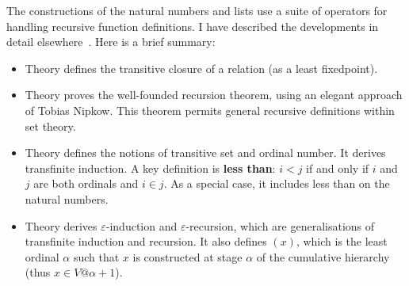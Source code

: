 The constructions of the natural numbers and lists use a suite of
operators for handling recursive function definitions.  I have described
the developments in detail elsewhere~\cite{paulson-set-II}.  Here is a brief
summary:
\begin{itemize}
  \item Theory  defines the transitive closure of a relation
    (as a least fixedpoint).

  \item Theory  proves the well-founded recursion theorem, using an
    elegant approach of Tobias Nipkow.  This theorem permits general
    recursive definitions within set theory.

  \item Theory  defines the notions of transitive set and ordinal
    number.  It derives transfinite induction.  A key definition is {\bf
      less than}: $i<j$ if and only if $i$ and $j$ are both ordinals and
    $i\in j$.  As a special case, it includes less than on the natural
    numbers.
    
  \item Theory  derives $\varepsilon$-induction and
    $\varepsilon$-recursion, which are generalisations of transfinite
    induction and recursion.  It also defines $(x)$, which is the
    least ordinal $\alpha$ such that $x$ is constructed at stage $\alpha$ of
    the cumulative hierarchy (thus $x\in V@{\alpha+1}$).
\end{itemize}

